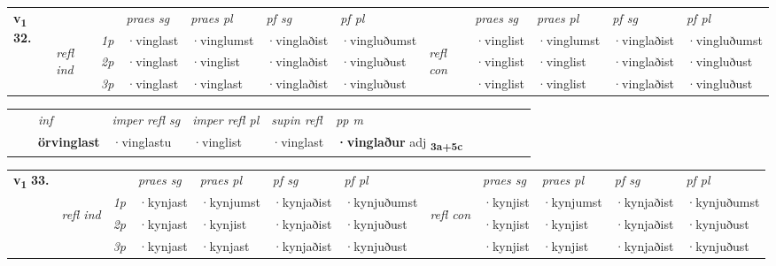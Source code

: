 \begin{tabular}{llllllllllll} \toprule
\multirow{4}{*}{{{\textbf{v{\textsubscript{1}}} \Large{\textbf{32.}}}}}  & &   &  \textit{praes sg}  & \textit{praes pl}  &\textit{pf sg} & \textit{pf pl} &  &  \textit{praes sg}  & \textit{praes pl}  & \textit{pf sg} & \textit{pf pl } \\*
	\cmidrule{4-7} \cmidrule{9-12}
 &\multirow{3}{*}{\begin{turn}{90}\textit{refl ind}\end{turn}} & {\textit{1p}} & ·vinglast & ·vinglumst    & ·vinglaðist & ·vingluðumst & \multirow{3}{*}{\begin{turn}{90}\textit{refl con}\end{turn}}  &·vinglist & ·vinglumst & ·vinglaðist & ·vingluðumst\\*
 &&  {\textit{2p}} &  ·vinglast  & ·vinglist   & ·vinglaðist & ·vingluðust & &·vinglist & ·vinglist & ·vinglaðist & ·vingluðust \\*
& &  {\textit{3p}} & ·vinglast & ·vinglast   & ·vinglaðist & ·vingluðust & & ·vinglist & ·vinglist& ·vinglaðist & ·vingluðust  \\*
\cmidrule{4-7} \cmidrule{9-12}
\end{tabular}


\begin{tabular}{llllllllllll}
 & & \textit{inf}   & \textit{imper refl sg} & \textit{imper refl pl}   & \textit{supin refl} & \textit{pp m}     \\*
  & & \textbf{örvinglast}    & ·vinglastu & ·vinglist   & ·vinglast & \textbf{·vinglaður} adj \textbf{\textsubscript{3a+5c}} \\*
\cmidrule{1-12}
\end{tabular}



\begin{tabular}{llllllllllll} \toprule
\multirow{4}{*}{{{\textbf{v{\textsubscript{1}}} \Large{\textbf{33.}}}}}  & &   &  \textit{praes sg}  & \textit{praes pl}  &\textit{pf sg} & \textit{pf pl} &  &  \textit{praes sg}  & \textit{praes pl}  & \textit{pf sg} & \textit{pf pl } \\*
	\cmidrule{4-7} \cmidrule{9-12}
 &\multirow{3}{*}{\begin{turn}{90}\textit{refl ind}\end{turn}} & {\textit{1p}} & ·kynjast & ·kynjumst    & ·kynjaðist & ·kynjuðumst & \multirow{3}{*}{\begin{turn}{90}\textit{refl con}\end{turn}}  &·kynjist & ·kynjumst & ·kynjaðist & ·kynjuðumst\\*
 &&  {\textit{2p}} &  ·kynjast  & ·kynjist   & ·kynjaðist & ·kynjuðust & &·kynjist & ·kynjist & ·kynjaðist & ·kynjuðust \\*
& &  {\textit{3p}} & ·kynjast & ·kynjast   & ·kynjaðist & ·kynjuðust & & ·kynjist & ·kynjist& ·kynjaðist & ·kynjuðust  \\*
\cmidrule{4-7} \cmidrule{9-12}
\end{tabular}


